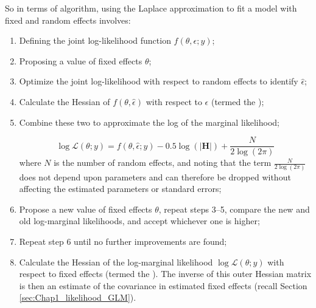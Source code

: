 So in terms of algorithm, using the Laplace approximation to fit a model with fixed and random effects involves:
\begin{enumerate}
    \item Defining the joint log-likelihood function \( f(\theta,\epsilon;y)\);

    \item Proposing a value of fixed effects \(\theta\);
    
    \item Optimize the joint log-likelihood with respect to random effects to identify \( \hat{\epsilon} \);
    
    \item Calculate the Hessian of \(f(\theta,\hat{\epsilon})\) with respect to \(\epsilon\) (termed the );
    
    \item Combine these two to approximate the log of the marginal likelihood;
    
\begin{equation} \label{eq:Chap2_laplace}
    \log \mathcal{L}(\theta;y) = f(\theta,\hat{\epsilon};y) - 0.5 \log(|\mathbf{H}|) + \frac{N}{2\log(2\pi)}
\end{equation}
    where \(N\) is the number of random effects, and noting that the term \(\frac{N}{2\log(2\pi)}\) does not depend upon parameters and can therefore be dropped without affecting the estimated parameters or standard errors;

    \item Propose a new value of fixed effects \(\theta\), repeat steps 3--5, compare the new and old log-marginal likelihoods, and accept whichever one is higher;
    
    \item Repeat step 6 until no further improvements are found;

    \item Calculate the Hessian of the log-marginal likelihood \(\log \mathcal{L}(\theta;y)\) with respect to fixed effects (termed the ).  The inverse of this outer Hessian matrix is then an estimate of the covariance in estimated fixed effects (recall Section \ref{sec:Chap1_likelihood_GLM}).
\end{enumerate}

